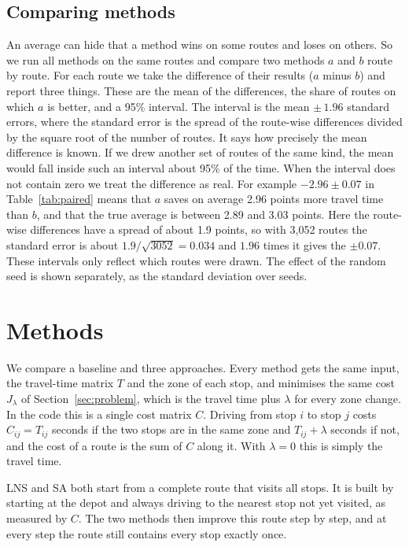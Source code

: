 \documentclass[11pt,a4paper]{article}
\newcommand{\Jl}{J_\lambda}
\begin{document}
\subsection{Comparing methods}
An average can hide that a method wins on some routes and loses on others. So we run all methods on the same routes and compare two methods $a$ and $b$ route by route. For each route we take the difference of their results ($a$ minus $b$) and report three things. These are the mean of the differences, the share of routes on which $a$ is better, and a 95\% interval. The interval is the mean $\pm\,1.96$ standard errors, where the standard error is the spread of the route-wise differences divided by the square root of the number of routes. It says how precisely the mean difference is known. If we drew another set of routes of the same kind, the mean would fall inside such an interval about 95\% of the time. When the interval does not contain zero we treat the difference as real. For example $-2.96\pm0.07$ in Table~\ref{tab:paired} means that $a$ saves on average 2.96 points more travel time than $b$, and that the true average is between 2.89 and 3.03 points. Here the route-wise differences have a spread of about 1.9 points, so with 3,052 routes the standard error is about $1.9/\sqrt{3052}=0.034$ and $1.96$ times it gives the $\pm0.07$. These intervals only reflect which routes were drawn. The effect of the random seed is shown separately, as the standard deviation over seeds.

\section{Methods}\label{sec:methods}
We compare a baseline and three approaches. Every method gets the same input, the travel-time matrix $T$ and the zone of each stop, and minimises the same cost $\Jl$ of Section~\ref{sec:problem}, which is the travel time plus $\lambda$ for every zone change. In the code this is a single cost matrix $C$. Driving from stop $i$ to stop $j$ costs $C_{ij}=T_{ij}$ seconds if the two stops are in the same zone and $T_{ij}+\lambda$ seconds if not, and the cost of a route is the sum of $C$ along it. With $\lambda=0$ this is simply the travel time.

LNS and SA both start from a complete route that visits all stops. It is built by starting at the depot and always driving to the nearest stop not yet visited, as measured by $C$. The two methods then improve this route step by step, and at every step the route still contains every stop exactly once.
\end{document}
